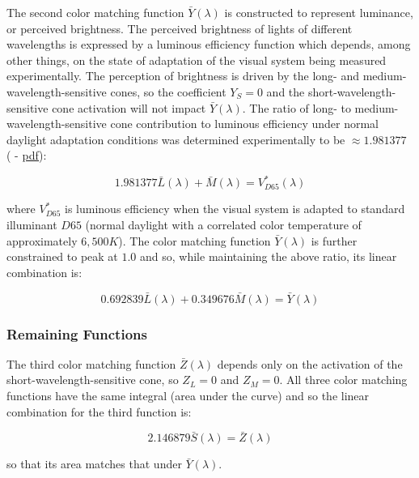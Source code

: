 \documentclass{article}
\begin{document}
\begin{multicols}{2}
The second color matching function $\bar{Y}(\lambda)$ is constructed to represent luminance, or perceived brightness.  The perceived brightness of lights of different wavelengths is expressed by a luminous efficiency function which depends, among other things, on the state of adaptation of the visual system being measured experimentally.  The perception of brightness is driven by the long- and medium-wavelength-sensitive cones, so the coefficient $Y_S=0$ and the short-wavelength-sensitive cone activation will not impact $\bar{Y}(\lambda)$.  The ratio of long- to medium-wavelength-sensitive cone contribution to luminous efficiency under normal daylight adaptation conditions was determined experimentally to be $\approx1.981377$ (\cite{sharpe2011luminous} - \href{http://www.cvrl.org/people/Stockman/pubs/2011\%20Vstar\%20correction\%20SSJJ.pdf}{pdf}):

\begin{equation} %
    1.981377\bar{L}(\lambda)+\bar{M}(\lambda)=V^*_{D65}(\lambda)
\end{equation}

where $V^*_{D65}$ is luminous efficiency when the visual system is adapted to standard illuminant $D65$ (normal daylight with a correlated color temperature of approximately $6,500K$).  The color matching function $\bar{Y}(\lambda)$ is further constrained to peak at $1.0$ and so, while maintaining the above ratio, its linear combination is:

\begin{equation} %
    0.692839\bar{L}(\lambda)+0.349676\bar{M}(\lambda)=\bar{Y}(\lambda)
\end{equation}

\subsubsection{Remaining Functions} %

The third color matching function $\bar{Z}(\lambda)$ depends only on the activation of the short-wavelength-sensitive cone, so $Z_L=0$ and $Z_M=0$.  All three color matching functions have the same integral (area under the curve) and so the linear combination for the third function is:

\begin{equation} %
    2.146879\bar{S}(\lambda)=\bar{Z}(\lambda)
\end{equation}

so that its area matches that under $\bar{Y}(\lambda)$.


\end{multicols}
\end{document}
